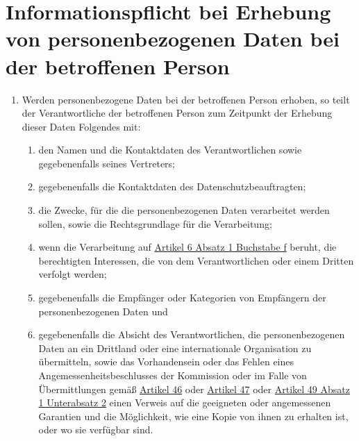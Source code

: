 \chapter{Informationspflicht bei Erhebung von personenbezogenen Daten bei der betroffenen Person}
\label{ch:13}


\begin{enumerate}

  \item Werden personenbezogene Daten bei der betroffenen Person erhoben, so teilt der Verantwortliche der betroffenen
   Person zum Zeitpunkt der Erhebung dieser Daten Folgendes mit:
  \label{itm:13-1}

  \begin{enumerate}
  
    \item den Namen und die Kontaktdaten des Verantwortlichen sowie gegebenenfalls seines Vertreters;
    \label{itm:13-1a}

    \item gegebenenfalls die Kontaktdaten des Datenschutzbeauftragten;
    \label{itm:13-1b}

    \item die Zwecke, für die die personenbezogenen Daten verarbeitet werden sollen, sowie die Rechtsgrundlage für die
     Verarbeitung;
    \label{itm:13-1c}

    \item wenn die Verarbeitung auf \hyperref[itm:06-1f]{Artikel 6 Absatz 1 Buchstabe f} beruht, die berechtigten
     Interessen, die von dem Verantwortlichen oder einem Dritten verfolgt werden;
    \label{itm:13-1d}

    \item gegebenenfalls die Empfänger oder Kategorien von Empfängern der personenbezogenen Daten und
    \label{itm:13-1e}

    \item gegebenenfalls die Absicht des Verantwortlichen, die personenbezogenen Daten an ein Drittland oder eine
     internationale Organisation zu übermitteln, sowie das Vorhandensein oder das Fehlen eines
     Angemessenheitsbeschlusses der Kommission oder im Falle von Übermittlungen gemäß \hyperref[ch:46]{Artikel 46} oder
     \hyperref[ch:47]{Artikel 47} oder \hyperref[itm:49-1-2]{Artikel 49 Absatz 1 Unterabsatz 2} einen Verweis auf die
      geeigneten oder angemessenen Garantien und die Möglichkeit, wie eine Kopie von ihnen zu erhalten ist, oder wo sie
      verfügbar sind.
    \label{itm:13-1f}


\end{enumerate}
\end{enumerate}
